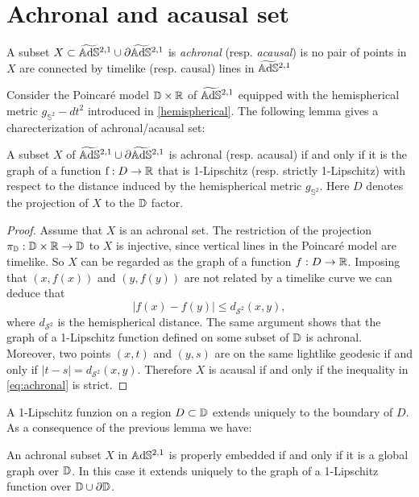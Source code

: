 \section{Achronal and acausal set}
\begin{definition}
    A subset $X \subset \widetilde{\mathbb{A}\mathrm{d}\mathbb{S}}{}^{2,1} \cup \partial\widetilde{\mathbb{A}\mathrm{d}\mathbb{S}}{}^{2,1}$ is \textit{achronal} (resp. \textit{acausal}) is no pair of points in $X$ are connected by timelike (resp. causal) lines in $\widetilde{\mathbb{A}\mathrm{d}\mathbb{S}}{}^{2,1}$
\end{definition}
Consider the Poincaré model $\mathbb{D}\times\mathbb{R}$ of $\widetilde{\mathbb{A}\mathrm{d}\mathbb{S}}{}^{2,1}$ equipped with the hemispherical metric $g_{\mathbb{S}^2} - dt^2$ introduced in \ref{hemispherical}. The following lemma gives a charecterization of achronal/acausal set:
\begin{lemma}\label{lem:1-lip}
    A subset $X$ of $\widetilde{\mathbb{A}\mathrm{d}\mathbb{S}}{}^{2,1} \cup \partial\widetilde{\mathbb{A}\mathrm{d}\mathbb{S}}{}^{2,1}$ is achronal (resp. acausal) if and only if it is the graph of a function $\text{f} : D \to \mathbb{R}$ that is 1-Lipschitz (resp. strictly 1-Lipschitz) with respect to the distance induced by the hemispherical metric $g_{\mathbb{S}^2}$. Here $D$ denotes the projection of $X$ to the $\mathbb{D}$ factor.
\end{lemma} 
\begin{proof}
    Assume that $X$ is an achronal set. The restriction of the projection $\pi_{\mathbb{D}} : \mathbb{D} \times \mathbb{R} \to \mathbb{D}$ to $X$ is injective, since vertical lines in the Poincaré model are timelike. So $X$ can be regarded as the graph of a function $f : D \to\mathbb{R}$. Imposing that $(x,f(x))$ and $(y,f(y))$ are not related by a timelike curve we can deduce that
    \begin{equation} \label{eq:achronal}
        |f(x) - f(y)| \leq d_{\mathcal{S}^2}(x,y),
    \end{equation}
    where $d_{\mathcal{S}^2}$ is the hemispherical distance. The same argument shows that the graph of a 1-Lipschitz function defined on some subset of $\mathbb{D}$ is achronal.\\
    Moreover, two points $(x,t)$ and $(y,s)$ are on the same lightlike geodesic if and only if $|t-s| =  d_{\mathcal{S}^2}(x,y)$. Therefore $X$ is acausal if and only if the inequality in \ref{eq:achronal} is strict.
\end{proof}
A 1-Lipschitz funzion on a region $D \subset \mathbb{D}$ extends uniquely to the boundary of $D$. As a consequence of the previous lemma we have:
\begin{lemma}\label{lem:global 1-lip}
    An achronal subset $X$ in $\mathbb{A}\mathrm{d}\mathbb{S}^{2,1}$ is properly embedded if and only if it is a global graph over $\mathbb{D}$. In this case it extends uniquely to the graph of a 1-Lipschitz function over $\mathbb{D} \cup \partial \mathbb{D}$.
\end{lemma}
